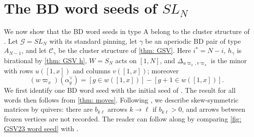 \documentclass[a4paper]{amsart}
\numberwithin{equation}{section}
\theoremstyle{definition}
\theoremstyle{remark}
\newcommand{\mcG}{\mathcal{G}}
\newcommand{\mcC}{\mathcal{C}}
\begin{document}
\section{The BD word seeds of \texorpdfstring{$SL_N$}{SLN}}
\label{sec: type A concise}
We now show that the BD word seeds in type A belong to the cluster structure of \cite{GSV23}.
Let $\mcG=SL_N$ with its standard pinning, let $\gamma$ be an aperiodic BD pair of type $A_{N-1}$, and let $\mcC_\gamma$ be the cluster structure of \cref{thm: GSV}.
Here $i^*=N-i$, $h_\gamma$ is birational by \cref{thm: GSV h}, $W=S_N$ acts on $[1,N]$, and $\Delta_{u\varpi_x,v\varpi_x}$ is the minor with rows $u([1,x])$ and columns $v([1,x])$; moreover
\begin{equation}
  \label{eq: pairing A concise}
  (w\varpi_x)(\alpha^\vee_g)=[g\in w([1,x])]-[g+1\in w([1,x])].
\end{equation}
We first identify one BD word seed with the initial seed of \cite{GSV23}. The result for all words then follows from \cref{thm: moves}.
Following \cite{GSV23}, we describe skew-symmetric matrices by quivers: there are $b_{k\ell}$ arrows $k\to\ell$ if $b_{k\ell}>0$, and arrows between frozen vertices are not recorded.
The reader can follow along by comparing \cref{fig: GSV23 word seed} with \cite[Figure~6]{GSV23}.
\end{document}
